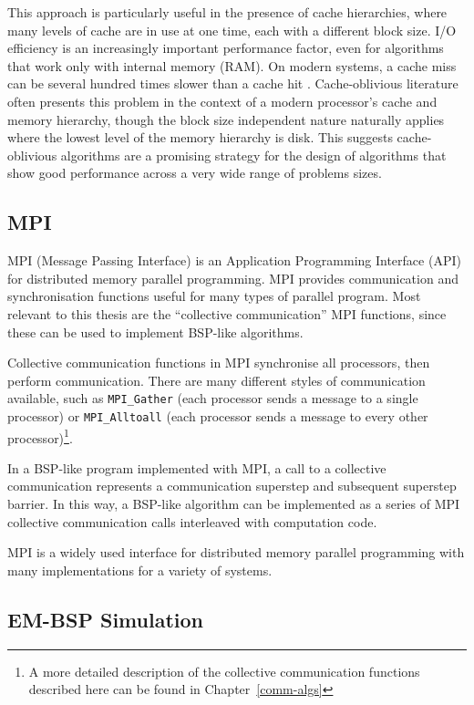 \documentclass[12pt]{carletoncsthesis}
\begin{document}
This approach is particularly useful in the presence of cache hierarchies,
where many levels of cache are in use at one time, each with a different
block size.  I/O efficiency is an increasingly important performance
factor, even for algorithms that work only with internal memory (RAM).
On modern systems, a cache miss can be several hundred times slower than a
cache hit \cite{intelperf}.  Cache-oblivious literature often presents this
problem in the context of a modern processor's cache and memory hierarchy,
though the block size independent nature naturally applies where the lowest
level of the memory hierarchy is disk.  This suggests cache-oblivious
algorithms are a promising strategy for the design of algorithms that show
good performance across a very wide range of problems sizes.

\subsection{MPI}


MPI (Message Passing Interface) \cite{mpidocs} is an Application Programming
Interface (API) for distributed memory parallel programming.  MPI provides
communication and synchronisation functions useful for many types of parallel
program.  Most relevant to this thesis are the ``collective communication''
MPI functions, since these can be used to implement BSP-like algorithms.

Collective communication functions in MPI synchronise all processors, then
perform communication.  There are many different styles of communication
available, such as {\tt MPI\_Gather} (each processor sends a message
to a single processor) or {\tt MPI\_Alltoall} (each processor sends a
message to every other processor)\footnote{A more detailed description
of the collective communication functions described here can be found in
Chapter~\ref{comm-algs}}.

In a BSP-like program implemented with MPI, a call to a collective
communication represents a communication superstep and subsequent superstep
barrier.  In this way, a BSP-like algorithm can be implemented as a series
of MPI collective communication calls interleaved with computation code.

MPI is a widely used interface for distributed memory parallel programming
with many implementations for a variety of systems.

\subsection{EM-BSP Simulation}
\end{document}
